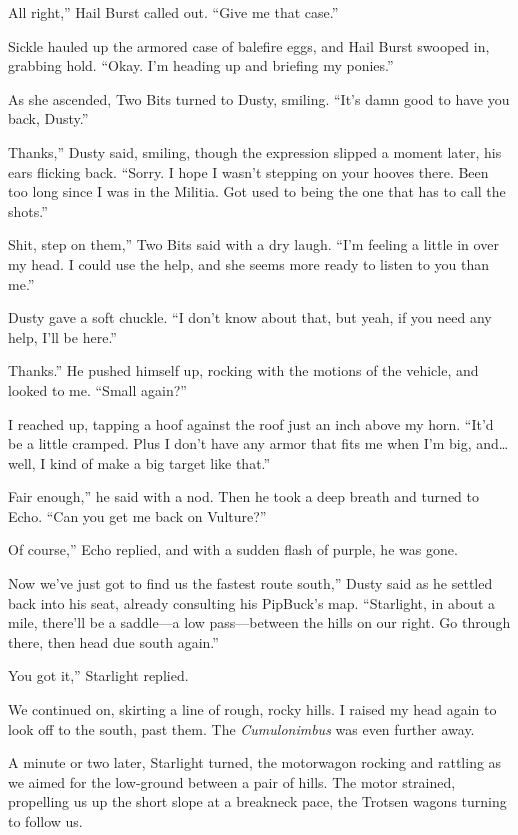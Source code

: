 \leavevmode{}All right,” Hail Burst called out. “Give me that case.”

Sickle hauled up the armored case of balefire eggs, and Hail Burst swooped in, grabbing hold. “Okay. I’m heading up and briefing my ponies.”

As she ascended, Two Bits turned to Dusty, smiling. “It’s damn good to have you back, Dusty.”

\leavevmode{}Thanks,” Dusty said, smiling, though the expression slipped a moment later, his ears flicking back. “Sorry. I hope I wasn’t stepping on your hooves there. Been too long since I was in the Militia. Got used to being the one that has to call the shots.”

\leavevmode{}Shit, step on them,” Two Bits said with a dry laugh. “I’m feeling a little in over my head. I could use the help, and she seems more ready to listen to you than me.”

Dusty gave a soft chuckle. “I don’t know about that, but yeah, if you need any help, I’ll be here.”

\leavevmode{}Thanks.” He pushed himself up, rocking with the motions of the vehicle, and looked to me. “Small again?”

I reached up, tapping a hoof against the roof just an inch above my horn. “It’d be a little cramped. Plus I don’t have any armor that fits me when I’m big, and… well, I kind of make a big target like that.”

\leavevmode{}Fair enough,” he said with a nod. Then he took a deep breath and turned to Echo. “Can you get me back on Vulture?”

\leavevmode{}Of course,” Echo replied, and with a sudden flash of purple, he was gone.

\leavevmode{}Now we’ve just got to find us the fastest route south,” Dusty said as he settled back into his seat, already consulting his PipBuck’s map. “Starlight, in about a mile, there’ll be a saddle—a low pass—between the hills on our right. Go through there, then head due south again.”

\leavevmode{}You got it,” Starlight replied.

We continued on, skirting a line of rough, rocky hills. I raised my head again to look off to the south, past them. The \textit{Cumulonimbus} was even further away.

A minute or two later, Starlight turned, the motorwagon rocking and rattling as we aimed for the low-ground between a pair of hills. The motor strained, propelling us up the short slope at a breakneck pace, the Trotsen wagons turning to follow us.

